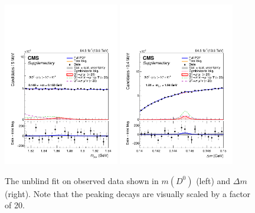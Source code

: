 \begin{figure}[h!]
    \begin{center}
      \includegraphics[width=0.45\textwidth]{figures/chapter4/results/SB_plot_m_full_test.pdf}
      \includegraphics[width=0.45\textwidth]{figures/chapter4/results/SB_plot_dm_full_test.pdf}\\
    \end{center}
    \caption{
      The unblind fit on observed data shown in $m(D^0)$ (left) and $\Delta m$ (right). Note that the peaking decays are visually scaled by a factor of 20.
    }
    \label{fig:final_observed_fit}
  \end{figure}